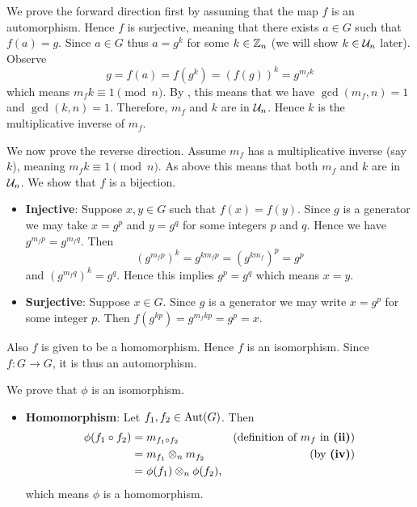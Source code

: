 \begin{questions}
\begin{partquestions}{\roman*}
        \item We prove the forward direction first by assuming that the map $f$ is an automorphism. Hence $f$ is surjective, meaning that there exists $a \in G$ such that $f(a) = g$. Since $a \in G$ thus $a = g^k$ for some $k \in \mathbb{Z}_n$ (we will show $k \in \mathcal{U}_{n}$ later). Observe
        \[
            g = f(a) = f(g^k) = (f(g))^k = g^{m_fk}
        \]
        which means $m_fk \equiv 1 \pmod n$. By , this means that we have $\gcd(m_f, n) = 1$ and $\gcd(k, n) = 1$. Therefore, $m_f$ and $k$ are in $\mathcal{U}_{n}$. Hence $k$ is the multiplicative inverse of $m_f$.

        We now prove the reverse direction. Assume $m_f$ has a multiplicative inverse (say $k$), meaning $m_fk \equiv 1 \pmod n$. As above this means that both $m_f$ and $k$ are in $\mathcal{U}_{n}$. We show that $f$ is a bijection.
        \begin{itemize}
            \item \textbf{Injective}: Suppose $x, y \in G$ such that $f(x) = f(y)$. Since $g$ is a generator we may take $x = g^p$ and $y = g^q$ for some integers $p$ and $q$. Hence we have $g^{m_fp} = g^{m_fq}$. Then
            \[
                \left(g^{m_fp}\right)^k = g^{km_fp} = \left(g^{km_f}\right)^p = g^p
            \]
            and $\left(g^{m_fq}\right)^k = g^q$. Hence this implies $g^p = g^q$ which means $x = y$.
            \item \textbf{Surjective}: Suppose $x \in G$. Since $g$ is a generator we may write $x = g^p$ for some integer $p$. Then $f(g^{kp}) = g^{m_fkp} = g^p = x$.
        \end{itemize}
        Also $f$ is given to be a homomorphism. Hence $f$ is an isomorphism. Since $f: G \to G$, it is thus an automorphism.

        \item We prove that $\phi$ is an isomorphism.
        \begin{itemize}
            \item \textbf{Homomorphism}: Let $f_1, f_2 \in \mathrm{Aut}(G)$. Then
            \begin{align*}
                \phi(f_1\circ f_2) &= m_{f_1\circ f_2} & (\text{definition of } m_f \text{ in }\textbf{(ii)})\\
                &= m_{f_1} \otimes_n m_{f_2} & (\text{by \textbf{(iv)}})\\
                &= \phi(f_1)\otimes_n\phi(f_2),
            \end{align*}
            which means $\phi$ is a homomorphism.


\end{itemize}
\end{partquestions}
\end{questions}
